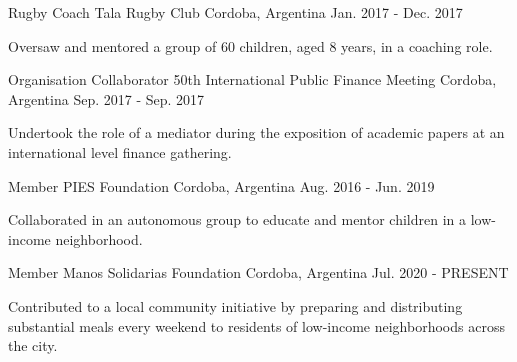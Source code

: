 

\begin{cventries}

  \cventry
    {Rugby Coach} %
    {Tala Rugby Club} %
    {Cordoba, Argentina} %
	{Jan. 2017 - Dec. 2017} %
    {
      \begin{cvitems} %
        \item {Oversaw and mentored a group of 60 children, aged 8 years, in a coaching role.}
      \end{cvitems}
    }

  \cventry
    {Organisation Collaborator} %
	{50th International Public Finance Meeting} %
    {Cordoba, Argentina} %
	{Sep. 2017 - Sep. 2017} %
    {
      \begin{cvitems} %
        \item {Undertook the role of a mediator during the exposition of academic papers at an international level finance gathering.}
      \end{cvitems}
    }

  \cventry
	{Member} %
    {PIES Foundation} %
    {Cordoba, Argentina} %
    {Aug. 2016 - Jun. 2019} %
    {
      \begin{cvitems} %
      	\item {Collaborated in an autonomous group to educate and mentor children in a low-income neighborhood.}	
      \end{cvitems}
    }

  \cventry
    {Member} %
    {Manos Solidarias Foundation} %
    {Cordoba, Argentina} %
    {Jul. 2020 - PRESENT} %
    {
      \begin{cvitems} %
      \item {Contributed to a local community initiative by preparing and distributing substantial meals every weekend to residents of low-income neighborhoods across the city.}
      \end{cvitems}
	}
	
\end{cventries}
